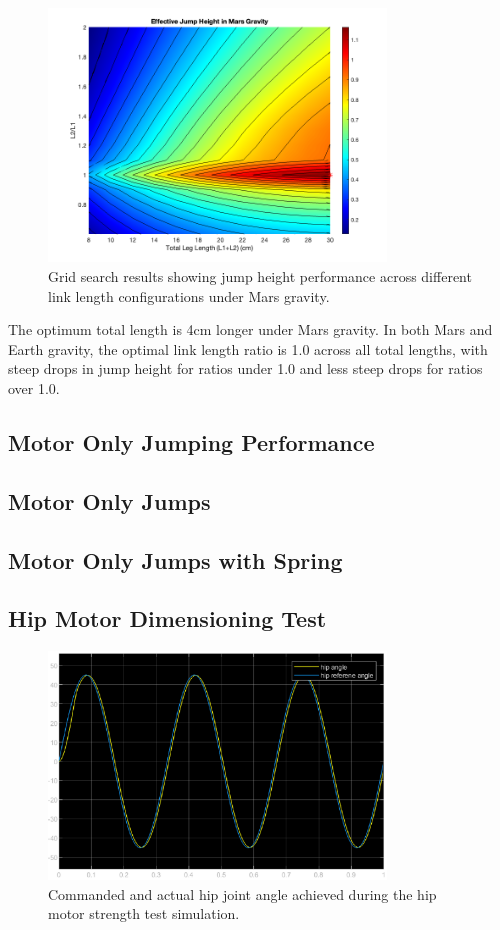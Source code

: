 \begin{figure}[h]
    \centering
    \includegraphics[width=0.8\textwidth]{Images/results/grid_search_results_mars_flat.png}
    \caption{Grid search results showing jump height performance across different link length configurations under Mars gravity.}
    \label{fig:results:grid_search_mars}
\end{figure}

The optimum total length is 4cm longer under Mars gravity. In both Mars and Earth gravity, the optimal link length ratio is 1.0 across all total lengths, with steep drops in jump height for ratios under 1.0 and less steep drops for ratios over 1.0. 

\subsection{Motor Only Jumping Performance}


\subsection{Motor Only Jumps}
\label{sec:results_motor_only_jumps}

\subsection{Motor Only Jumps with Spring}
\label{sec:results_motor_only_jumps_with_spring}

\subsection{Hip Motor Dimensioning Test}

\begin{figure}[H]
    \centering
    \includegraphics[width=0.8\textwidth]{Images/attitude_stable_test_result.eps}
    \caption{Commanded and actual hip joint angle achieved during the hip motor strength test simulation. }
    \label{fig:hip_motor_strength_test}
\end{figure}